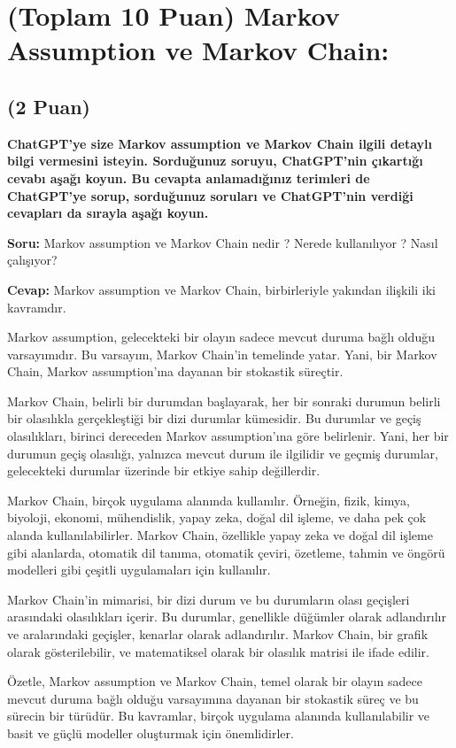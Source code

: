 \documentclass[11pt]{article}
\begin{document}
\section{(Toplam 10 Puan) Markov Assumption ve Markov Chain:}

\subsection{(2 Puan)} \textbf{ChatGPT’ye size Markov assumption ve Markov Chain ilgili detaylı bilgi vermesini isteyin. Sorduğunuz soruyu, ChatGPT'nin çıkartığı cevabı aşağı koyun. Bu cevapta anlamadığınız terimleri de ChatGPT’ye sorup, sorduğunuz soruları ve ChatGPT’nin verdiği cevapları da sırayla aşağı koyun.}

 \textbf{Soru:} Markov assumption ve Markov Chain nedir ? Nerede kullanılıyor ?  Nasıl çalışıyor? 

 \textbf{Cevap:} Markov assumption ve Markov Chain, birbirleriyle yakından ilişkili iki kavramdır.

Markov assumption, gelecekteki bir olayın sadece mevcut duruma bağlı olduğu varsayımıdır. Bu varsayım, Markov Chain'in temelinde yatar. Yani, bir Markov Chain, Markov assumption'ına dayanan bir stokastik süreçtir.

Markov Chain, belirli bir durumdan başlayarak, her bir sonraki durumun belirli bir olasılıkla gerçekleştiği bir dizi durumlar kümesidir. Bu durumlar ve geçiş olasılıkları, birinci dereceden Markov assumption'ına göre belirlenir. Yani, her bir durumun geçiş olasılığı, yalnızca mevcut durum ile ilgilidir ve geçmiş durumlar, gelecekteki durumlar üzerinde bir etkiye sahip değillerdir.

Markov Chain, birçok uygulama alanında kullanılır. Örneğin, fizik, kimya, biyoloji, ekonomi, mühendislik, yapay zeka, doğal dil işleme, ve daha pek çok alanda kullanılabilirler. Markov Chain, özellikle yapay zeka ve doğal dil işleme gibi alanlarda, otomatik dil tanıma, otomatik çeviri, özetleme, tahmin ve öngörü modelleri gibi çeşitli uygulamaları için kullanılır.

Markov Chain'in mimarisi, bir dizi durum ve bu durumların olası geçişleri arasındaki olasılıkları içerir. Bu durumlar, genellikle düğümler olarak adlandırılır ve aralarındaki geçişler, kenarlar olarak adlandırılır. Markov Chain, bir grafik olarak gösterilebilir, ve matematiksel olarak bir olasılık matrisi ile ifade edilir.

Özetle, Markov assumption ve Markov Chain, temel olarak bir olayın sadece mevcut duruma bağlı olduğu varsayımına dayanan bir stokastik süreç ve bu sürecin bir türüdür. Bu kavramlar, birçok uygulama alanında kullanılabilir ve basit ve güçlü modeller oluşturmak için önemlidirler.
 
\end{document}
